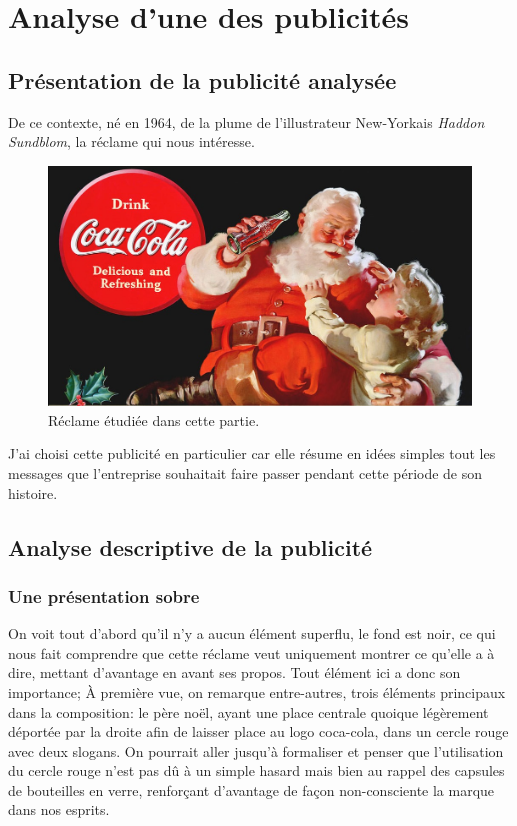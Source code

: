 \chapter{Analyse d'une des publicités}

\label{Analyse d'une des publicités}

\section{Présentation de la publicité analysée}

De ce contexte, né en 1964, de la plume de l'illustrateur New-Yorkais \textit{Haddon Sundblom}, la réclame qui nous intéresse.

\begin{figure}[th]
\centering
\includegraphics[width=130mm]{medias/affiche_coca}
\decoRule
\caption{Réclame étudiée dans cette partie.}
\end{figure}

J'ai choisi cette publicité en particulier car elle résume en idées simples tout les messages que l'entreprise souhaitait faire passer pendant cette période de son histoire.


\section{Analyse descriptive de la publicité}

\subsection{Une présentation sobre}
On voit tout d'abord qu'il n'y a aucun élément superflu, le fond est noir, ce qui nous fait comprendre que cette réclame veut uniquement montrer ce qu'elle a à dire, mettant d'avantage en avant ses propos. Tout élément ici a donc son importance; À première vue, on remarque entre-autres, trois éléments principaux dans la composition: le père noël, ayant une place centrale quoique légèrement déportée par la droite afin de laisser place au logo coca-cola, dans un cercle rouge avec deux slogans. On pourrait aller jusqu'à formaliser et penser que l'utilisation du cercle rouge n'est pas dû à un simple hasard mais bien au rappel des capsules de bouteilles en verre, renforçant d'avantage de façon non-consciente la marque dans nos esprits.
